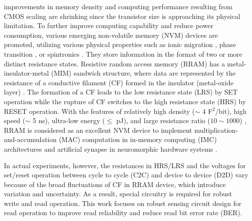 
 improvements in memory density and computing performance resulting from CMOS scaling are shrinking since the transistor size is approaching its physical limitation. To further improve computing capability and reduce power consumption, various emerging non-volatile memory (NVM) devices are promoted, utilizing various physical properties such as ionic migration \cite{waser2010nanoionics}, phase transition \cite{wuttig2007phase}, or spintronics \cite{6853380}. They store information in the format of two or more distinct resistance states.
Resistive random access memory (RRAM) has a metal-insulator-metal (MIM) sandwich structure, where data are represented by the resistance of a conductive filament (CF) formed in the insulator (metal-oxide layer) \cite{7448912}. The formation of a CF leads to the low resistance state (LRS) by SET operation while the rupture of CF switches to the high resistance state (HRS) by RESET operation.  
With the features of relatively high density ($\sim$ 4 F$^2$/bit), high speed ($\sim$ 5 ns), ultra-low energy ($\leq$ pJ), and large resistance ratio ($10 \sim 1000$) \cite{6361301, 2019Emerging}, RRAM is considered as an excellent NVM device to implement multiplication-and-accumulation (MAC) computation in in-memory computing (IMC) architectures \cite{7950949, 8998360, 9335229} and artificial synapse in neuromorphic hardware systems \cite{8705375, 7423754, 8340055, 9369873}.

In actual experiments, however, the resistances in HRS/LRS and the voltages for set/reset operation between cycle to cycle (C2C) and device to device (D2D) vary because of the broad fluctuations of CF in RRAM device, which introduce variation and uncertainty. 
As a result, special circuitry is required for robust write and read operation. This work focuses on robust sensing circuit design for read operation to improve read reliability and reduce read bit error rate (BER).


